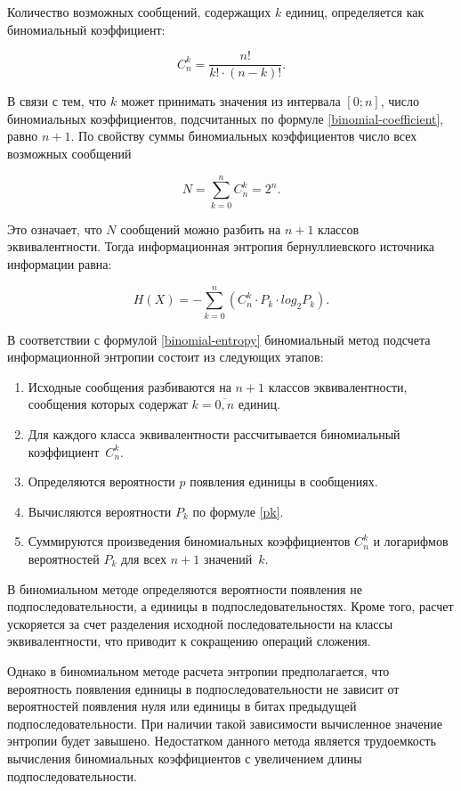Количество возможных сообщений, содержащих $k$ единиц, определяется как биномиальный коэффициент:

\begin{equation}\label{binomial-coefficient}
	C_{n}^k = \frac{n!}{k! \cdot (n - k)!}.
\end{equation}

В связи с тем, что $k$ может принимать значения из интервала $[0; n]$, число биномиальных коэффициентов, подсчитанных по формуле \ref{binomial-coefficient}, равно $n + 1$. По свойству суммы биномиальных коэффициентов число всех возможных сообщений

\begin{equation}
	N = \sum_{k = 0}^n C_{n}^k = 2^n.
\end{equation}

Это означает, что $N$ сообщений можно разбить на $n + 1$ классов эквивалентности. Тогда информационная энтропия бернуллиевского источника информации равна:

\begin{equation}\label{binomial-entropy}
	H(X) = -\sum_{k = 0}^n (C_{n}^k \cdot P_{k} \cdot log_{2}P_{k}).
\end{equation}

В соответствии с формулой \ref{binomial-entropy} биномиальный метод подсчета информационной энтропии состоит из следующих этапов:

\begin{enumerate}
	\item Исходные сообщения разбиваются на $n + 1$ классов эквивалентности, сообщения которых содержат $k = \overline{0, n}$ единиц.
	\item Для каждого класса эквивалентности рассчитывается биномиальный коэффициент~$C_{n}^k$.
	\item Определяются вероятности $p$ появления единицы в сообщениях.
	\item Вычисляются вероятности $P_{k}$ по формуле \ref{pk}.
	\item Суммируются произведения биномиальных коэффициентов $C_{n}^k$ и логарифмов вероятностей $P_{k}$ для всех $n + 1$ значений~$k$.
\end{enumerate}

В биномиальном методе определяются вероятности появления не подпоследовательности, а единицы в подпоследовательностях. Кроме того, расчет ускоряется за счет разделения исходной последовательности на классы эквивалентности, что приводит к сокращению операций сложения.

Однако в биномиальном методе расчета энтропии предполагается, что вероятность появления единицы в подпоследовательности не зависит от вероятностей появления нуля или единицы в битах предыдущей подпоследовательности. При наличии такой зависимости вычисленное значение энтропии будет завышено. Недостатком данного метода является трудоемкость вычисления биномиальных коэффициентов с увеличением длины подпоследовательности.
